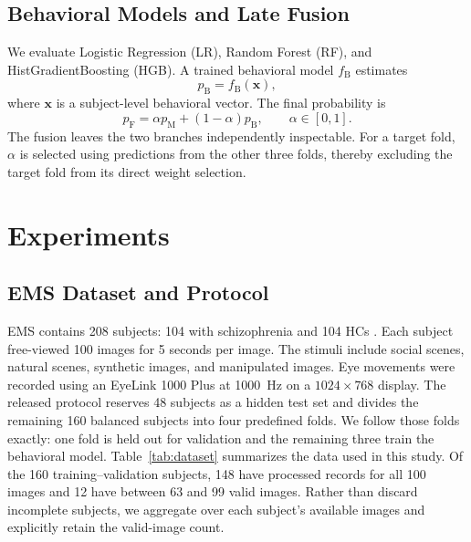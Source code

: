 \documentclass[conference,a4paper]{IEEEtran}
\begin{document}
\subsection{Behavioral Models and Late Fusion}
We evaluate Logistic Regression (LR), Random Forest (RF), and HistGradientBoosting (HGB). A trained behavioral model $f_{\mathrm{B}}$ estimates
\begin{equation}
p_{\mathrm{B}}=f_{\mathrm{B}}(\mathbf{x}),
\end{equation}
where $\mathbf{x}$ is a subject-level behavioral vector. The final probability is
\begin{equation}
p_{\mathrm{F}}=\alpha p_{\mathrm{M}}+(1-\alpha)p_{\mathrm{B}},\qquad \alpha\in[0,1].
\label{eq:fusion}
\end{equation}
The fusion leaves the two branches independently inspectable. For a target fold, $\alpha$ is selected using predictions from the other three folds, thereby excluding the target fold from its direct weight selection.

\section{Experiments}
\subsection{EMS Dataset and Protocol}
EMS contains 208 subjects: 104 with schizophrenia and 104 HCs \cite{song2024ems}. Each subject free-viewed 100 images for 5 seconds per image. The stimuli include social scenes, natural scenes, synthetic images, and manipulated images. Eye movements were recorded using an EyeLink 1000 Plus at 1000~Hz on a $1024\times768$ display. The released protocol reserves 48 subjects as a hidden test set and divides the remaining 160 balanced subjects into four predefined folds. We follow those folds exactly: one fold is held out for validation and the remaining three train the behavioral model. Table~\ref{tab:dataset} summarizes the data used in this study. Of the 160 training--validation subjects, 148 have processed records for all 100 images and 12 have between 63 and 99 valid images. Rather than discard incomplete subjects, we aggregate over each subject's available images and explicitly retain the valid-image count.
\end{document}
